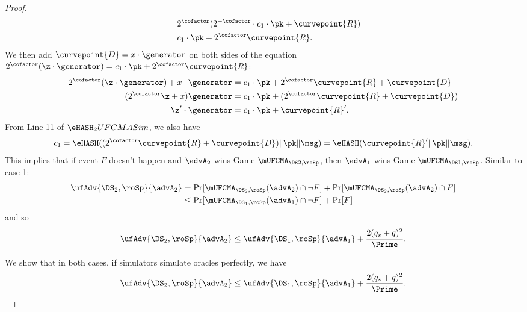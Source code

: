 \begin{proof}
\begin{align*}
	&= 2^\cofactor (2^{-\cofactor} \cdot c_1 \cdot\pk + \curvepoint{R})\\
	&=  c_1 \cdot \pk + 2^\cofactor \curvepoint{R}.
	\end{align*}
	We then add $\curvepoint{D} = x \cdot \generator$ on both sides of the equation $2^\cofactor(\z \cdot  \generator) =  c_1 \cdot\pk + 2^\cofactor \curvepoint{R}$:
	\begin{align*} 
	2^\cofactor(\z \cdot  \generator) +  x \cdot \generator &=  c_1 \cdot \pk + 2^\cofactor \curvepoint{R} + \curvepoint{D}\\
	(2^\cofactor \z + x)\generator &=  c_1 \cdot \pk+ (2^\cofactor \curvepoint{R} + \curvepoint{D})\\
	\z' \cdot  \generator &= c_1 \cdot \pk + \curvepoint{R}'.
	\end{align*}
	From Line 11 of $\eHASH_2UFCMASim$, we also have
	\[c_1 = \eHASH((2^\cofactor\curvepoint{R} + \curvepoint{D}) \|\pk\| \msg) = \eHASH(\curvepoint{R}'\|\pk\| \msg).\]
	This implies that if event $F$ doesn't happen and $\advA_2$ wins Game $\mUFCMA_{\DS2,\roSp}$, then $\advA_1$ wins Game $\mUFCMA_{\DS1,\roSp}$. Similar to case 1:
	\begin{align*}
	\ufAdv{\DS_2,\roSp}{\advA_2} &= \Pr[\mUFCMA_{\DS_2,\roSp}(\advA_2) \cap \neg F] +  \Pr[\mUFCMA_{\DS_2,\roSp}(\advA_2) \cap F]\\
	& \leq \Pr[\mUFCMA_{\DS_1,\roSp}(\advA_1) \cap \neg F] + \Pr[F]
	\end{align*}
	and so
	\[\ufAdv{\DS_2,\roSp}{\advA_2} \leq \ufAdv{\DS_1,\roSp}{\advA_1} +  \frac{2(q_s + q)^2}{\Prime}.\]
	
	We show that in both cases, if simulators simulate oracles perfectly, we have
	\[\ufAdv{\DS_2,\roSp}{\advA_2} \leq \ufAdv{\DS_1,\roSp}{\advA_1} +  \frac{2(q_s + q)^2}{\Prime}.\]
	

\end{proof}
